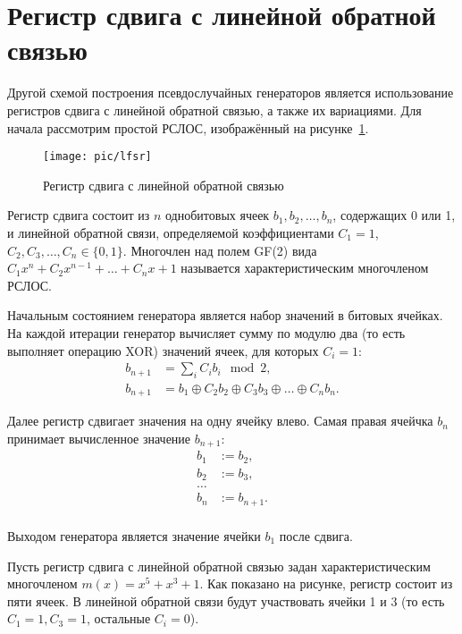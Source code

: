 \section[РСЛОС]{Регистр сдвига с линейной обратной связью}\label{section-lfsr}

Другой схемой построения псевдослучайных генераторов является использование регистров сдвига с линейной обратной связью, а также их вариациями. Для начала рассмотрим простой РСЛОС, изображённый на рисунке~\ref{fig:lfsr}.

\begin{figure}[thb]
	\centering
	\texttt{[image: pic/lfsr]}
	\caption{Регистр сдвига с линейной обратной связью}
	\label{fig:lfsr}
\end{figure}

Регистр сдвига состоит из $n$ однобитовых ячеек $b_1, b_2, \dots, b_n$, содержащих 0 или 1, и линейной обратной связи, определяемой коэффициентами $C_1 = 1$, $C_2, C_3, \dots, C_n \in \{0, 1\}$. Многочлен над полем GF(2) вида $C_1 x^n + C_2 x^{n-1} + \dots + C_n x + 1$ называется характеристическим многочленом РСЛОС.

Начальным состоянием генератора является набор значений в битовых ячейках. На каждой итерации генератор вычисляет сумму по модулю два (то есть выполняет операцию XOR) значений ячеек, для которых $C_i=1$:
\[\begin{array}{ll}
	b_{n+1} &= \sum\limits_{i} C_i b_i \mod 2, \\
	b_{n+1} &= b_1 \oplus C_2 b_2 \oplus C_3 b_3 \oplus \dots \oplus C_n b_n.
\end{array}\]

Далее регистр сдвигает значения на одну ячейку влево. Самая правая ячейчка $b_n$ принимает вычисленное значение $b_{n+1}$:
\[\begin{array}{ll}
	b_1 & := b_2, \\
	b_2 & := b_3, \\
	\dots \\
	b_n & := b_{n+1}. \\
\end{array}
\]

Выходом генератора является значение ячейки $b_1$ после сдвига.

\example
Пусть регистр сдвига с линейной обратной связью задан характеристическим многочленом $m\left(x\right)=x^{5} + x^{3} + 1$. Как показано на рисунке, регистр состоит из пяти ячеек. В линейной обратной связи будут участвовать ячейки 1 и 3 (то есть $C_1 = 1, C_3 = 1$, остальные $C_i = 0$).

